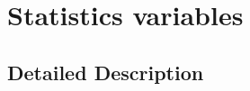 \hypertarget{group__chaos-test-variables-stats}{\section{Statistics variables}
\label{group__chaos-test-variables-stats}
}


\subsection{Detailed Description}
